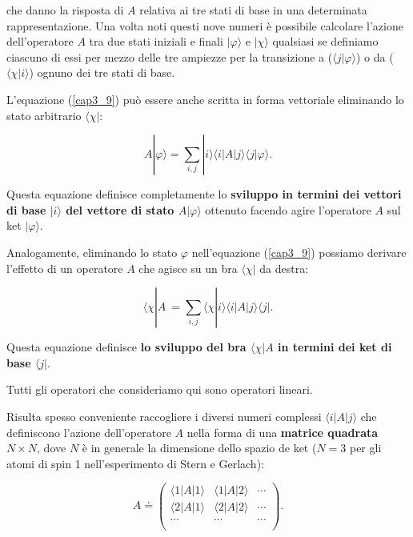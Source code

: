 \documentclass[a4paper,12pt,oneside]{book}
\begin{document}
che danno la risposta di $A$ relativa ai tre stati di base in una determinata rappresentazione. Una volta noti questi nove numeri è possibile calcolare l'azione dell'operatore $A$ tra due stati iniziali e finali $| \varphi \rangle $ e $| \chi \rangle$ qualsiasi se definiamo ciascuno di essi per mezzo delle tre ampiezze per la transizione a ($\langle j | \varphi \rangle $) o da ($\langle \chi | i \rangle$) ognuno dei tre stati di base.

L'equazione (\ref{cap3_9}) può essere anche scritta in forma vettoriale eliminando lo stato arbitrario $\langle \chi | $:

\begin{equation}
A| \varphi \rangle = \sum \limits_{i,j}  |i \rangle \langle i | A | j \rangle \langle j | \varphi \rangle .
\label{cap3_10}
\end{equation}

Questa equazione definisce completamente lo \textbf{sviluppo in termini dei vettori di base $ | i \rangle$ del vettore di stato $A | \varphi \rangle $} ottenuto facendo agire l'operatore $A$ sul ket $ | \varphi \rangle$.

Analogamente, eliminando lo stato $\varphi$ nell'equazione (\ref{cap3_9}) possiamo derivare l'effetto di un operatore $A$ che agisce su un bra $ \langle \chi |$ da destra:

\begin{equation}
\langle \chi | A\ = \sum \limits_{i,j} \langle \chi | i \rangle \langle i | A  | j \rangle \langle j | .
\label{cap3_11}
\end{equation}

Questa equazione definisce \textbf{lo sviluppo del bra $\langle \chi |A$ in termini dei ket di base $\langle j |$}.

Tutti gli operatori che consideriamo qui sono operatori lineari.

Risulta spesso conveniente raccogliere i diversi numeri complessi $\langle i | A | j \rangle$ che definiscono l'azione dell'operatore $A$ nella forma di una \textbf{matrice quadrata} $N\times N$, dove $N$ è in generale la dimensione dello spazio de ket ($N=3$ per gli atomi di spin 1 nell'esperimento di Stern e Gerlach):

\begin{equation}
A \doteq
\begin{pmatrix}
\langle 1 | A  | 1 \rangle & \langle 1 | A  | 2 \rangle & \cdots\\
\langle 2 | A  | 1 \rangle & \langle 2 | A  | 2 \rangle & \cdots \\
\cdots & \cdots & \cdots \\
\end{pmatrix} .
\end{equation}
\end{document}
